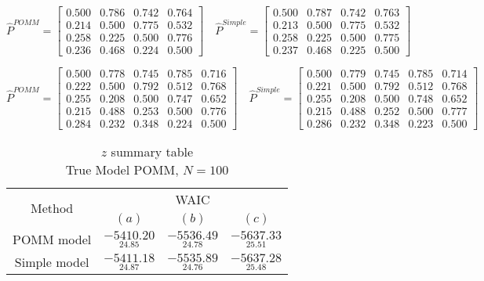 \documentclass[11pt]{amsart}
\begin{document}
$$\hat{P}^{POMM}=\left[\begin{array}{cccc}0.500 & 0.786 & 0.742 & 0.764 \\
0.214 & 0.500 & 0.775 & 0.532 \\
0.258 & 0.225 & 0.500 & 0.776 \\
0.236 & 0.468 & 0.224 & 0.500 \end{array}\right] \quad \hat{P}^{Simple}=\left[\begin{array}{cccc}
0.500 & 0.787 & 0.742 & 0.763 \\
0.213 & 0.500 & 0.775 & 0.532 \\
0.258 & 0.225 & 0.500 & 0.775 \\
0.237 & 0.468 & 0.225 & 0.500 
 \end{array}\right]
$$

$$
\hat{P}^{POMM}= \left[\begin{array}{ccccc}0.500 & 0.778 & 0.745 & 0.785 & 0.716 \\
0.222 & 0.500 & 0.792 & 0.512 & 0.768 \\
0.255 & 0.208 & 0.500 & 0.747 & 0.652 \\
0.215 & 0.488 & 0.253 & 0.500 & 0.776 \\
0.284 & 0.232 & 0.348 & 0.224 & 0.500 \end{array}\right] \quad \hat{P}^{Simple}= \left[\begin{array}{ccccc}0.500 & 0.779 & 0.745 & 0.785 & 0.714 \\
0.221 & 0.500 & 0.792 & 0.512 & 0.768 \\
0.255 & 0.208 & 0.500 & 0.748 & 0.652 \\
0.215 & 0.488 & 0.252 & 0.500 & 0.777 \\
0.286 & 0.232 & 0.348 & 0.223 & 0.500 \end{array}\right]
$$





\begin{table}[htbp]
\centering
\caption*{
{\large $z$ summary table} \\ 
{\small True Model POMM, $N=100$}
} 
\begin{tabular}{cccc}
\toprule
\multirow{2}{*}{Method}  &\multicolumn{3}{c}{WAIC} \\
\cmidrule(lr){2-4}
& $(a)$ & $(b)$ & $(c)$  \\
\midrule
POMM model  &$\underset{24.85}{-5410.20}$ & $\underset{24.78}{-5536.49}$ & $\underset{25.51}{-5637.33}$  \\
Simple model  &$\underset{24.87}{-5411.18}$ & $\underset{24.76}{-5535.89}$ & $\underset{25.48}{-5637.28}$ \\
\bottomrule
\end{tabular}
\label{table:simulations_from_simple}
\end{table}
\end{document}
